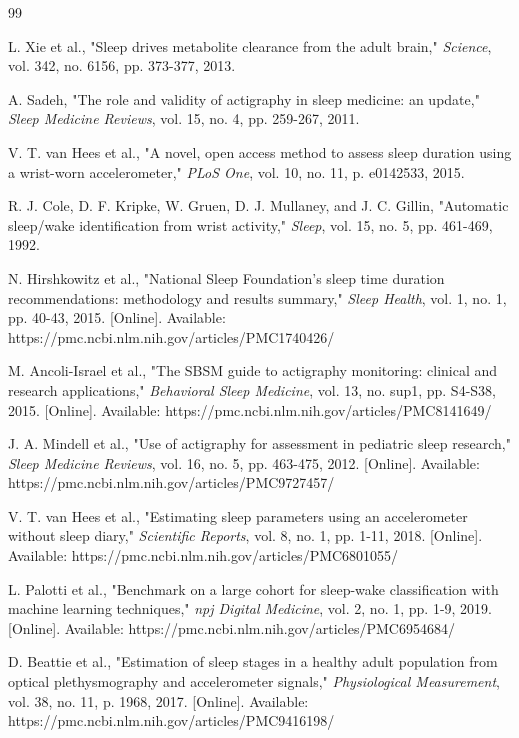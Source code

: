 \documentclass[conference]{IEEEtran}
\begin{document}
\begin{thebibliography}{
	99}

	L. Xie et al., "Sleep drives metabolite clearance from the adult brain," \textit{Science}, vol. 342, no. 6156, pp. 373-377, 2013.

	A. Sadeh, "The role and validity of actigraphy in sleep medicine: an update," \textit{Sleep Medicine Reviews}, vol. 15, no. 4, pp. 259-267, 2011.

	V. T. van Hees et al., "A novel, open access method to assess sleep duration using a wrist-worn accelerometer," \textit{PLoS One}, vol. 10, no. 11, p. e0142533, 2015.

	R. J. Cole, D. F. Kripke, W. Gruen, D. J. Mullaney, and J. C. Gillin, "Automatic sleep/wake identification from wrist activity," \textit{Sleep}, vol. 15, no. 5, pp. 461-469, 1992.

	N. Hirshkowitz et al., "National Sleep Foundation's sleep time duration recommendations: methodology and results summary," \textit{Sleep Health}, vol. 1, no. 1, pp. 40-43, 2015. [Online]. Available: https://pmc.ncbi.nlm.nih.gov/articles/PMC1740426/

	M. Ancoli-Israel et al., "The SBSM guide to actigraphy monitoring: clinical and research applications," \textit{Behavioral Sleep Medicine}, vol. 13, no. sup1, pp. S4-S38, 2015. [Online]. Available: https://pmc.ncbi.nlm.nih.gov/articles/PMC8141649/

	J. A. Mindell et al., "Use of actigraphy for assessment in pediatric sleep research," \textit{Sleep Medicine Reviews}, vol. 16, no. 5, pp. 463-475, 2012. [Online]. Available: https://pmc.ncbi.nlm.nih.gov/articles/PMC9727457/

	V. T. van Hees et al., "Estimating sleep parameters using an accelerometer without sleep diary," \textit{Scientific Reports}, vol. 8, no. 1, pp. 1-11, 2018. [Online]. Available: https://pmc.ncbi.nlm.nih.gov/articles/PMC6801055/

	L. Palotti et al., "Benchmark on a large cohort for sleep-wake classification with machine learning techniques," \textit{npj Digital Medicine}, vol. 2, no. 1, pp. 1-9, 2019. [Online]. Available: https://pmc.ncbi.nlm.nih.gov/articles/PMC6954684/

	D. Beattie et al., "Estimation of sleep stages in a healthy adult population from optical plethysmography and accelerometer signals," \textit{Physiological Measurement}, vol. 38, no. 11, p. 1968, 2017. [Online]. Available: https://pmc.ncbi.nlm.nih.gov/articles/PMC9416198/


\end{thebibliography}
\end{document}
